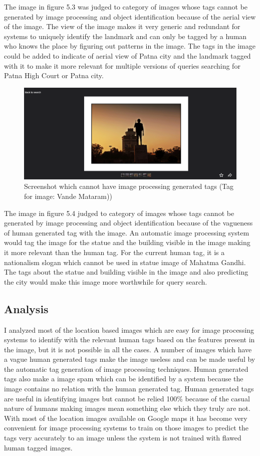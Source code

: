 \documentclass[12pt]{report}
\begin{document}
The image in figure 5.3 was judged to category of images whose tags cannot be generated by image processing and object identification because of the aerial view of the image. The view of the image makes it very generic and redundant for systems to uniquely identify the landmark and can only be tagged by a human who knows the place by figuring out patterns in the image. The tags in the image could be added to indicate of aerial view of Patna city and the landmark tagged with it to make it more relevant for multiple versions of queries searching for Patna High Court or Patna city.\\
\begin{figure}[ht]
  \centering
  \includegraphics[width=1\textwidth]{Problem11_11/HumanTag2.png}
  \caption{Screenshot which cannot have image processing generated tags (Tag for image: Vande Mataram))}
  \label{fig:1}
\end{figure}
The image in figure 5.4  judged to category of images whose tags cannot be generated by image processing and object identification because of the vagueness of human generated tag with the image. An automatic image processing system would tag the image for the statue and the building visible in the image making it more relevant than the human tag. For the current human tag, it is a nationalism slogan which cannot be used in statue image of Mahatma Gandhi. The tags about the statue and building visible in the image and also predicting the city would make this image more worthwhile for query search.
\subsection{Analysis}
I analyzed most of the location based images which are easy for image processing systems to identify with the relevant human tags based on the features present in the image, but it is not possible in all the cases. A number of images which have a vague human generated tags make the image useless and can be made useful by the automatic tag generation of image processing techniques. Human generated tags also make a image spam which can be identified by a system because the image contains no relation with the human generated tag. Human generated tags are useful in identifying images but cannot be relied 100\% because of the casual nature of humans making images mean something else which they truly are not. \\
With most of the location images available on Google maps it has become very convenient for image processing systems to train on those images to predict the tags very accurately to an image unless the system is not trained with flawed human tagged images.
\end{document}
